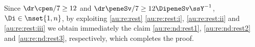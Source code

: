 \begin{pro}
  Since $\dr\cpen/7\geq 12$ and $\dr\peneSv/7\geq12\DipeneSv\ssY^{-1}$,
  $\Di\in\nset{1,n}$, by exploiting \cref{au:re:rest}
  \ref{au:re:rest:i}, \ref{au:re:rest:ii} and \ref{au:re:rest:iii} we
  obtain immediately the claim \ref{au:re:nd:rest1},
  \ref{au:re:nd:rest2} and \ref{au:re:nd:rest3}, respectively, which  completes the proof.
\proEnd\end{pro}

